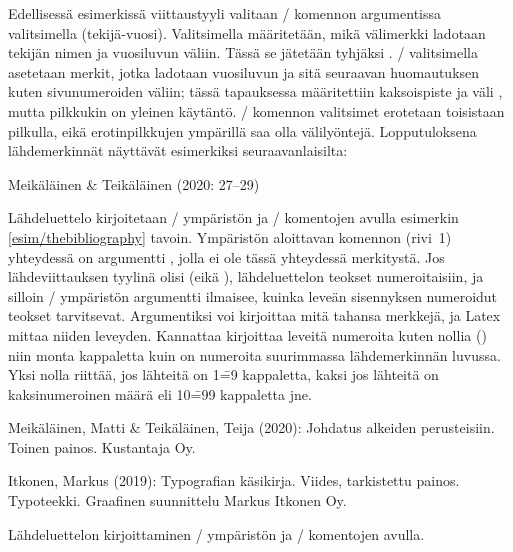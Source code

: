 Edellisessä esimerkissä viittaustyyli valitaan \-/
komennon argumentissa valitsimella 
(tekijä\--vuosi). Valitsimella  määritetään, mikä
välimerkki ladotaan tekijän nimen ja vuosiluvun väliin. Tässä se
jätetään tyhjäksi \koodi{\{\}}. \-/ valitsimella
asetetaan merkit, jotka ladotaan vuosiluvun ja sitä seuraavan
huomautuksen kuten sivunumeroiden väliin; tässä tapauksessa määritettiin
kaksoispiste ja väli \koodi{\{:~\}}, mutta pilkkukin on yleinen
käytäntö. \-/ komennon valitsimet erotetaan
toisistaan pilkulla, eikä erotinpilkkujen ympärillä saa olla
välilyöntejä. Lopputuloksena lähdemerkinnät näyttävät esimerkiksi
seuraavanlaisilta:

\begin{koodilohkosis}
\citet*[27--29]{johdatus} %
\end{koodilohkosis}

\begin{tulossis}
  Meikäläinen \& Teikäläinen (2020: 27--29)
\end{tulossis}

Lähdeluettelo kirjoitetaan \-/ ympäristön ja
\-/ komentojen avulla esimerkin
\ref{esim/thebibliography} tavoin. Ympäristön aloittavan komennon
(rivi~1) yhteydessä on argumentti , jolla ei ole tässä
yhteydessä merkitystä. Jos lähdeviittauksen tyylinä olisi
 (eikä ), lähdeluettelon teokset
numeroitaisiin, ja silloin \-/ ympäristön
argumentti ilmaisee, kuinka leveän sisennyksen numeroidut teokset
tarvitsevat. Argumentiksi voi kirjoittaa mitä tahansa merkkejä, ja Latex
mittaa niiden leveyden. Kannattaa kirjoittaa leveitä numeroita kuten
nollia () niin monta kappaletta kuin on numeroita suurimmassa
lähdemerkinnän luvussa. Yksi nolla riittää, jos lähteitä on 1\==9
kappaletta, kaksi jos lähteitä on kaksinumeroinen määrä eli 10\==99
kappaletta jne.

\begin{esimerkki*}

\begin{koodilohko}
\begin{thebibliography}{00}

  Meikäläinen, Matti \& Teikäläinen, Teija (2020): Johdatus alkeiden
  perusteisiin. Toinen painos. Kustantaja Oy.

 Itkonen, Markus (2019): Typografian
  käsikirja. Viides, tarkistettu painos. Typoteekki. Graafinen
  suunnittelu Markus Itkonen Oy.

\end{thebibliography}
\end{koodilohko}
  \caption{Lähdeluettelon kirjoittaminen \-/
    ympäristön ja \-/ komentojen avulla.}
  \label{esim/thebibliography}
\end{esimerkki*}

